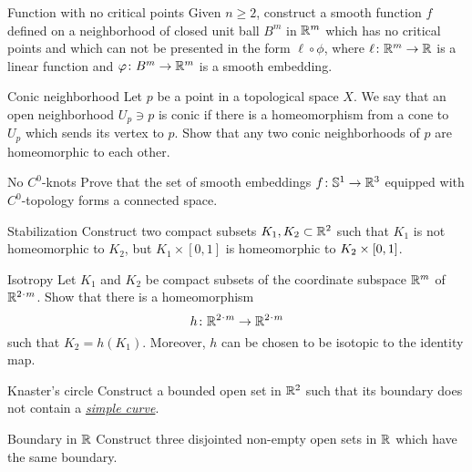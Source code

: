 \documentclass[twoside]{book}
\begin{document}
{\begin{pr}{\many}{Function with no critical points}\label{Function with no critical points}
Given $n\ge 2$, construct a smooth function $f$ defined on a neighborhood of closed unit ball $B^m$ in $\mathbb{R}^m$ which has no critical points and which can not be presented in the form $\ell\circ\phi$, 
where $\ell\colon\mathbb{R}^m\to\mathbb{R}$ is a linear function and $\varphi\colon B^m\to\mathbb{R}^m$ is a smooth embedding.
\end{pr}

\begin{pr}{}{Conic neighborhood}\label{Conic neighborhood}  
Let $p$ be a point in a topological space $X$.
We say that an open neighborhood $U_p\ni p$ is conic
if there is a homeomorphism from a cone
to $U_p$ which sends its vertex to $p$.
Show that any two conic neighborhoods of $p$ are homeomorphic to each other.
\end{pr}

\begin{pr}{}{No $C^0$-knots}\label{No knots}
Prove that the set of smooth embeddings $f\:\mathbb{S}^1\z\to\RR^3$ equipped with $C^0$-topology 
forms a connected space.
\end{pr}

\begin{pr}{}{Stabilization}\label{Simple stabilization}
Construct two compact subsets $K_1, K_2\subset\mathbb{R}^2$ such that
$K_1$ is not homeomorphic to $K_2$, but $K_1\times[0,1]$ is homeomorphic to $K_2\z\times[0,1]$.
\end{pr}

\begin{pr}{}{Isotropy}\label{Isotropy}
Let $K_1$ and $K_2$ be compact subsets of the coordinate subspace $\mathbb{R}^m$ of $\RR^{2\cdot m}$.
Show that there is a homeomorphism 
\[h\:\RR^{2\cdot m}\z\to \RR^{2\cdot m}\] 
such that $K_2=h(K_1)$.
Moreover, $h$ can be chosen to be isotopic to the identity map.
\end{pr}


\begin{pr}{}{Knaster's circle}\label{Knaster's circle} 
Construct 
a bounded open set in $\mathbb{R}^2$ 
such that 
its boundary does not contain a 
\hyperref[Simple curve]{\emph{simple curve}}.
\end{pr}


\begin{pr}{\easy}{Boundary in $\mathbb{R}$}\label{Boundary in R}
Construct three disjointed non-empty open sets in $\mathbb{R}$ which have the same boundary.
\end{pr}

}
\end{document}
